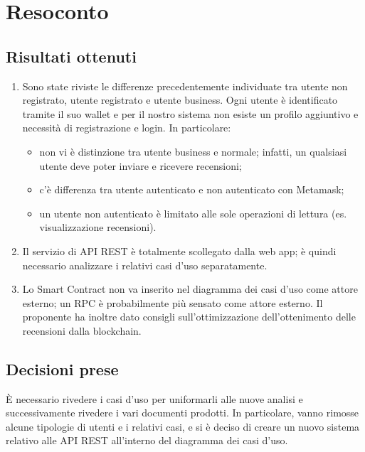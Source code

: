 \section{Resoconto}

\subsection{Risultati ottenuti}

\begin{enumerate}
    \item Sono state riviste le differenze precedentemente individuate tra utente non
          registrato, utente registrato e utente business. Ogni utente è identificato
          tramite il suo wallet e per il nostro sistema non esiste un profilo aggiuntivo
          e necessità di registrazione e login. In particolare:
          \begin{itemize}
              \item non vi è distinzione tra utente business e normale; infatti, un qualsiasi
                    utente deve poter inviare e ricevere recensioni;
              \item c'è differenza tra utente autenticato e non autenticato con Metamask;
              \item un utente non autenticato è limitato alle sole operazioni di lettura (es.
                    visualizzazione recensioni).
          \end{itemize}
    \item Il servizio di API REST è totalmente scollegato dalla web app; è quindi
          necessario analizzare i relativi casi d'uso separatamente.
    \item Lo Smart Contract non va inserito nel diagramma dei casi d'uso come attore
          esterno; un RPC è probabilmente più sensato come attore esterno. Il proponente
          ha inoltre dato consigli sull'ottimizzazione dell'ottenimento delle recensioni
          dalla blockchain.
\end{enumerate}

\subsection{Decisioni prese}
È necessario rivedere i casi d'uso per uniformarli alle nuove analisi e successivamente rivedere i vari documenti prodotti. In particolare, vanno rimosse alcune tipologie di utenti e i relativi casi, e si è deciso di creare un nuovo sistema relativo alle API REST all'interno del diagramma dei casi d'uso.